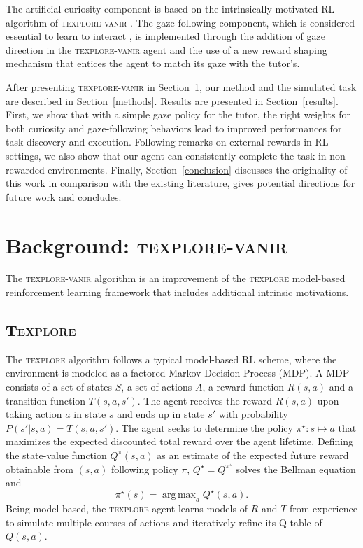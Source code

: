 \documentclass[letterpaper, 10 pt, conference]{ieeeconf}  %
\DeclareMathOperator*{\argmax}{arg\,max}
\begin{document}
The artificial curiosity component is based on the intrinsically motivated RL algorithm of \textsc{texplore-vanir} \cite{hester_intrinsically_2012}.
The gaze-following component, which is considered essential to learn to interact \cite{nomikou_constructing_2016, kaplan_challenges_2006}, is implemented through the addition of gaze direction in the \textsc{texplore-vanir} agent and the use of a new reward shaping mechanism that entices the agent to match its gaze with the tutor's.

After presenting \textsc{texplore-vanir} in Section~\ref{background}, our method and the simulated task are described in Section~\ref{methods}. Results are presented in Section~\ref{results}. First, we show that with a simple gaze policy for the tutor, the right weights for both curiosity and gaze-following behaviors lead to improved performances for task discovery and execution. Following remarks on external rewards in RL settings, we also show that our agent can consistently complete the task in non-rewarded environments. Finally, Section~\ref{conclusion} discusses the originality of this work in comparison with the existing literature, gives potential directions for future work and concludes.

\section{Background: \textsc{texplore-vanir}}
\label{background}

The \textsc{texplore-vanir} algorithm is an improvement of the \textsc{texplore} model-based reinforcement learning framework \cite{hester_texplore:_2013} that includes additional intrinsic motivations.

\subsection{\textsc{Texplore}}

The \textsc{texplore} algorithm follows a typical model-based RL scheme, where the environment is modeled as a factored Markov Decision Process (MDP). A MDP consists of a set of states $S$, a set of actions $A$, a reward function $R(s,a)$ and a transition function $T(s,a,s')$. The agent receives the reward $R(s,a)$ upon taking action $a$ in state $s$ and ends up in state $s'$ with probability $P(s'|s,a) = T(s,a,s')$. The agent seeks to determine the policy $\pi^\star: s \mapsto a$ that maximizes the expected discounted total reward over the agent lifetime. Defining the state-value function $Q^{\pi}(s,a)$ as an estimate of the expected future reward obtainable from $(s,a)$ following policy $\pi$, $Q^\star = Q^{\pi^\star}$ solves the Bellman equation \cite{sutton_reinforcement_1998} and 
\begin{equation}
\pi^\star(s) = \argmax_{a} Q^{\star}(s,a).
\end{equation} 
Being model-based, the \textsc{texplore} agent learns models of $R$ and $T$ from experience to simulate multiple courses of actions and iteratively refine its Q-table of $Q(s,a)$.
\end{document}
